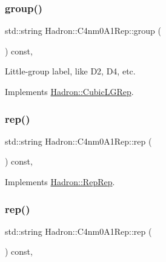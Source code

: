 \subsubsection{\texorpdfstring{group()}{group()}\hspace{0.1cm}{\footnotesize\ttfamily [5/5]}}
{\footnotesize\ttfamily std\+::string Hadron\+::\+C4nm0\+A1\+Rep\+::group (\begin{DoxyParamCaption}{ }\end{DoxyParamCaption}) const\hspace{0.3cm}{\ttfamily [inline]}, {\ttfamily [virtual]}}

Little-\/group label, like D2, D4, etc. 

Implements \mbox{\hyperlink{structHadron_1_1CubicLGRep_a9bdb14b519a611d21379ed96a3a9eb41}{Hadron\+::\+Cubic\+L\+G\+Rep}}.

\mbox{\label{structHadron_1_1C4nm0A1Rep_a5abe060187192307a0f68c3ac73704bc}} 
\subsubsection{\texorpdfstring{rep()}{rep()}\hspace{0.1cm}{\footnotesize\ttfamily [1/5]}}
{\footnotesize\ttfamily std\+::string Hadron\+::\+C4nm0\+A1\+Rep\+::rep (\begin{DoxyParamCaption}{ }\end{DoxyParamCaption}) const\hspace{0.3cm}{\ttfamily [inline]}, {\ttfamily [virtual]}}



Implements \mbox{\hyperlink{structHadron_1_1RepRep_ab3213025f6de249f7095892109575fde}{Hadron\+::\+Rep\+Rep}}.

\mbox{\label{structHadron_1_1C4nm0A1Rep_a5abe060187192307a0f68c3ac73704bc}} 
\subsubsection{\texorpdfstring{rep()}{rep()}\hspace{0.1cm}{\footnotesize\ttfamily [2/5]}}
{\footnotesize\ttfamily std\+::string Hadron\+::\+C4nm0\+A1\+Rep\+::rep (\begin{DoxyParamCaption}{ }\end{DoxyParamCaption}) const\hspace{0.3cm}{\ttfamily [inline]}, {\ttfamily [virtual]}}



